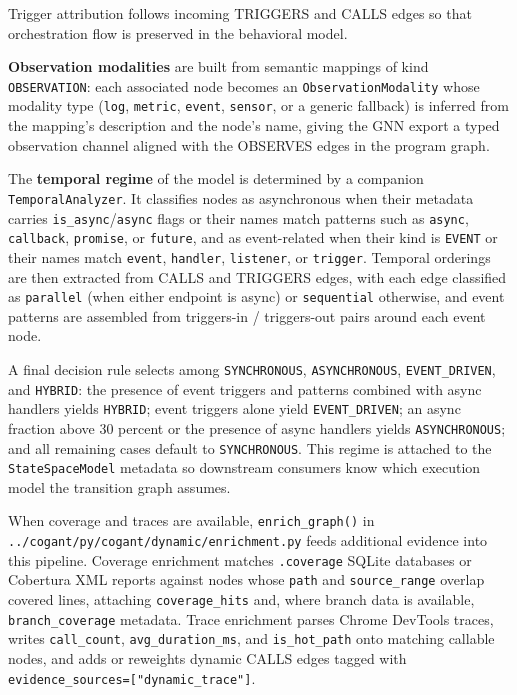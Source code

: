 \documentclass[
]{article}
\begin{document}
Trigger attribution follows incoming TRIGGERS and CALLS edges so that
orchestration flow is preserved in the behavioral model.

\textbf{Observation modalities} are built from semantic mappings of kind
\texttt{OBSERVATION}: each associated node becomes an
\texttt{ObservationModality} whose modality type (\texttt{log},
\texttt{metric}, \texttt{event}, \texttt{sensor}, or a generic fallback)
is inferred from the mapping's description and the node's name, giving
the GNN export a typed observation channel aligned with the OBSERVES
edges in the program graph.

The \textbf{temporal regime} of the model is determined by a companion
\texttt{TemporalAnalyzer}. It classifies nodes as asynchronous when
their metadata carries \texttt{is\_async}/\texttt{async} flags or their
names match patterns such as \texttt{async}, \texttt{callback},
\texttt{promise}, or \texttt{future}, and as event-related when their
kind is \texttt{EVENT} or their names match \texttt{event},
\texttt{handler}, \texttt{listener}, or \texttt{trigger}. Temporal
orderings are then extracted from CALLS and TRIGGERS edges, with each
edge classified as \texttt{parallel} (when either endpoint is async) or
\texttt{sequential} otherwise, and event patterns are assembled from
triggers-in / triggers-out pairs around each event node.

A final decision rule selects among \texttt{SYNCHRONOUS},
\texttt{ASYNCHRONOUS}, \texttt{EVENT\_DRIVEN}, and \texttt{HYBRID}: the
presence of event triggers and patterns combined with async handlers
yields \texttt{HYBRID}; event triggers alone yield
\texttt{EVENT\_DRIVEN}; an async fraction above 30 percent or the
presence of async handlers yields \texttt{ASYNCHRONOUS}; and all
remaining cases default to \texttt{SYNCHRONOUS}. This regime is attached
to the \texttt{StateSpaceModel} metadata so downstream consumers know
which execution model the transition graph assumes.

When coverage and traces are available, \texttt{enrich\_graph()} in
\texttt{../cogant/py/cogant/dynamic/enrichment.py} feeds additional
evidence into this pipeline. Coverage enrichment matches
\texttt{.coverage} SQLite databases or Cobertura XML reports against
nodes whose \texttt{path} and \texttt{source\_range} overlap covered
lines, attaching \texttt{coverage\_hits} and, where branch data is
available, \texttt{branch\_coverage} metadata. Trace enrichment parses
Chrome DevTools traces, writes \texttt{call\_count},
\texttt{avg\_duration\_ms}, and \texttt{is\_hot\_path} onto matching
callable nodes, and adds or reweights dynamic CALLS edges tagged with
\texttt{evidence\_sources={[}"dynamic\_trace"{]}}.
\end{document}
